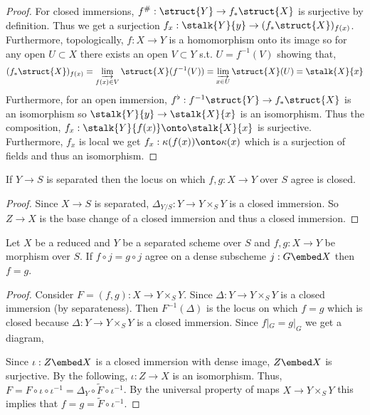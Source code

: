 \documentclass[12pt]{article}
\begin{document}
\begin{proof}
For closed immersions, $f^{\#} : \struct{Y} \to f_* \struct{X}$ is surjective by definition. Thus we get a surjection $f_x : \stalk{Y}{y} \to (f_* \struct{X})_{f(x)}$. Furthermore, topologically, $f : X \to Y$ is a homomorphism onto its image so for any open $U \subset X$ there exists an open $V \subset Y$ s.t. $U = f^{-1}(V)$ showing that,
\[ (f_* \struct{X})_{f(x)} = \varinjlim_{f(x) \in V} \struct{X}(f^{-1}(V)) = \varinjlim_{x \in U} \struct{X}(U) = \stalk{X}{x} \]
Furthermore, for an open immersion, $f^\flat : f^{-1} \struct{Y} \to f_* \struct{X}$ is an isomorphism so $\stalk{Y}{y} \to \stalk{X}{x}$ is an isomorphism. Thus the composition, $f_x : \stalk{Y}{f(x)} \onto \stalk{X}{x}$ is surjective. Furthermore, $f_x$ is local we get $f_x : \kappa(f(x)) \onto \kappa(x)$ which is a surjection of fields and thus an isomorphism. 
\end{proof}

\begin{lemma}
If $Y \to S$ is separated then the locus on which $f,g : X \to Y$ over $S$ agree is closed.
\end{lemma}

\begin{proof}
Since $X \to S$ is separated, $\Delta_{Y/S} : Y \to Y \times_S Y$ is a closed immersion. So $Z \to X$ is the base change of a closed immersion and thus a closed immersion. 
\end{proof}

\begin{lemma}
Let $X$ be a reduced and $Y$ be a separated scheme over $S$ and $f ,g : X \to Y$ be morphism over $S$. If $f \circ j = g \circ j$ agree on a dense subscheme $j : G \embed X$ then $f = g$.
\end{lemma}

\begin{proof}
Consider $F = (f, g) : X \to Y \times_S Y$. Since $\Delta : Y \to Y \times_S Y$ is a closed immersion (by separateness). Then $F^{-1}(\Delta)$ is the locus on which $f = g$ which is closed because $\Delta : Y \to Y \times_S Y$ is a closed immersion. Since $f|_G = g|_G$ we get a diagram,
\begin{center}
\end{center}
Since $\iota : Z \embed X$ is a closed immersion with dense image, $Z \embed X$ is surjective. By the following, $\iota : Z \to X$ is an isomorphism. Thus, $F = F \circ \iota \circ \iota^{-1} = \Delta_Y \circ \tilde{F} \circ \iota^{-1}$. By the universal property of maps $X \to Y \times_S Y$ this implies that $f = g = \tilde{F} \circ \iota^{-1}$.
\end{proof}
\end{document}
